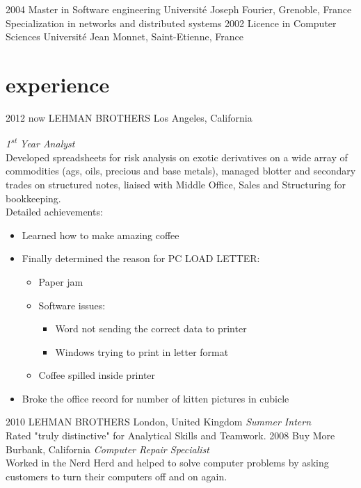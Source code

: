 \documentclass[]{k-cv} %
\begin{document}
\begin{entrylist}
\entry
{2004}
{Master {\normalfont in Software engineering}}
{Universit\'{e} Joseph Fourier, Grenoble, France}
{Specialization in networks and distributed systems}
\entry
{2002}
{Licence {\normalfont in Computer Sciences}}
{Universit\'{e} Jean Monnet, Saint-Etienne, France}
{}
\end{entrylist}

\section{experience}

\begin{entrylist}
\entry
{2012 \to now}
{LEHMAN BROTHERS}
{Los Angeles, California}
{\emph{1\textsuperscript{st} Year Analyst} \\
Developed spreadsheets for risk analysis on exotic derivatives on a wide array
of commodities (ags, oils, precious and base metals), managed blotter and
secondary trades on structured notes, liaised with Middle Office, Sales and
Structuring for bookkeeping. \\
Detailed achievements:
\begin{itemize}
\item Learned how to make amazing coffee
\item Finally determined the reason for \textsc{PC LOAD LETTER}:
\begin{itemize}
\item Paper jam
\item Software issues:
\begin{itemize}
\item Word not sending the correct data to printer
\item Windows trying to print in letter format
\end{itemize}
\item Coffee spilled inside printer
\end{itemize}
\item Broke the office record for number of kitten pictures in cubicle
\end{itemize}}
\entry
{2010 }
{LEHMAN BROTHERS}
{London, United Kingdom}
{\emph{Summer Intern} \\
Rated "truly distinctive" for Analytical Skills and Teamwork.}
\entry
{2008 }
{Buy More}
{Burbank, California}
{\emph{Computer Repair Specialist} \\
Worked in the Nerd Herd and helped to solve computer problems by asking
customers to turn their computers off and on again.}
\end{entrylist}
\end{document}
